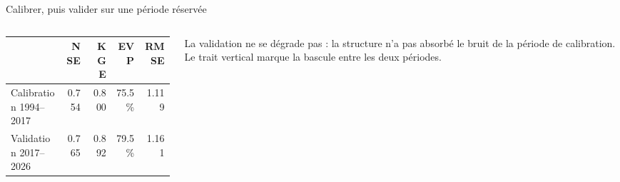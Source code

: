 \documentclass[aspectratio=169,11pt]{beamer}
\begin{document}
\begin{frame}{Calibrer, puis valider sur une période réservée}


\vspace{0.15cm}
\begin{columns}[T]
\begin{column}{0.52\textwidth}
\footnotesize
\begin{tabularx}{\linewidth}{@{}Yrrrr@{}}
\toprule
 & \textbf{NSE} & \textbf{KGE} & \textbf{EVP} & \textbf{RMSE} \\
\midrule
Calibration \tiny 1994--2017 & \num{0,754} & \num{0,800} & \SI{75,5}{\percent} & \num{1,119} \\
Validation \tiny 2017--2026  & \num{0,765} & \num{0,892} & \SI{79,5}{\percent} & \num{1,161} \\
\bottomrule
\end{tabularx}
\end{column}

\begin{column}{0.45\textwidth}
\footnotesize
La validation ne se dégrade pas : la structure n'a pas absorbé le bruit de la période de
calibration. Le trait vertical marque la bascule entre les deux périodes.

\vspace{0.3em}
\end{column}
\end{columns}
\end{frame}
\end{document}
